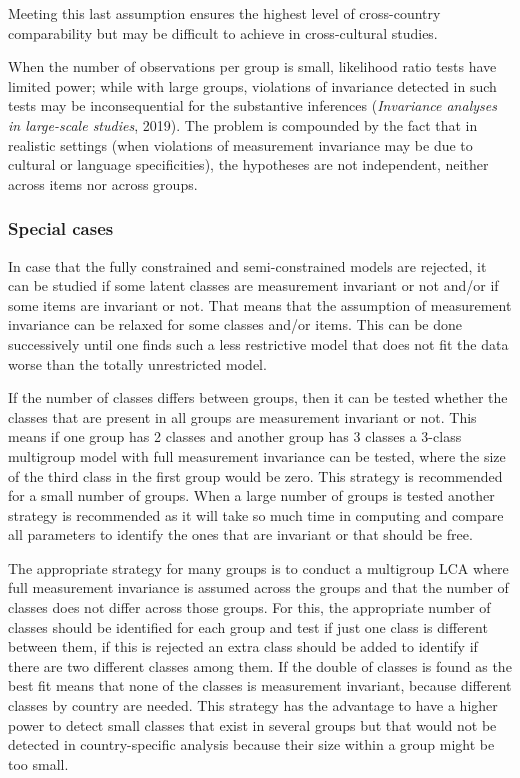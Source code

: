 \documentclass[12pt,a4paper,oneside]{reedthesis}
\begin{document}
Meeting this last assumption ensures the highest level of cross-country comparability but may be difficult to achieve in cross-cultural studies.

When the number of observations per group is small, likelihood ratio tests have limited power; while with large groups, violations of invariance detected in such tests may be inconsequential for the substantive inferences (\emph{Invariance analyses in large-scale studies}, 2019). The problem is compounded by the fact that in realistic settings (when violations of measurement invariance may be due to cultural or language specificities), the hypotheses are not independent, neither across items nor across groups.

\hypertarget{special-cases}{%
\subsubsection{Special cases}\label{special-cases}}

In case that the fully constrained and semi-constrained models are rejected, it can be studied if some latent classes are measurement invariant or not and/or if some items are invariant or not. That means that the assumption of measurement invariance can be relaxed for some classes and/or items. This can be done successively until one finds such a less restrictive model that does not fit the data worse than the totally unrestricted model.

If the number of classes differs between groups, then it can be tested whether the classes that are present in all groups are measurement invariant or not. This means if one group has 2 classes and another group has 3 classes a 3-class multigroup model with full measurement invariance can be tested, where the size of the third class in the first group would be zero. This strategy is recommended for a small number of groups. When a large number of groups is tested another strategy is recommended as it will take so much time in computing and compare all parameters to identify the ones that are invariant or that should be free.

The appropriate strategy for many groups is to conduct a multigroup LCA where full measurement invariance is assumed across the groups and that the number of classes does not differ across those groups. For this, the appropriate number of classes should be identified for each group and test if just one class is different between them, if this is rejected an extra class should be added to identify if there are two different classes among them. If the double of classes is found as the best fit means that none of the classes is measurement invariant, because different classes by country are needed. This strategy has the advantage to have a higher power to detect small classes that exist in several groups but that would not be detected in country-specific analysis because their size within a group might be too small.
\end{document}
